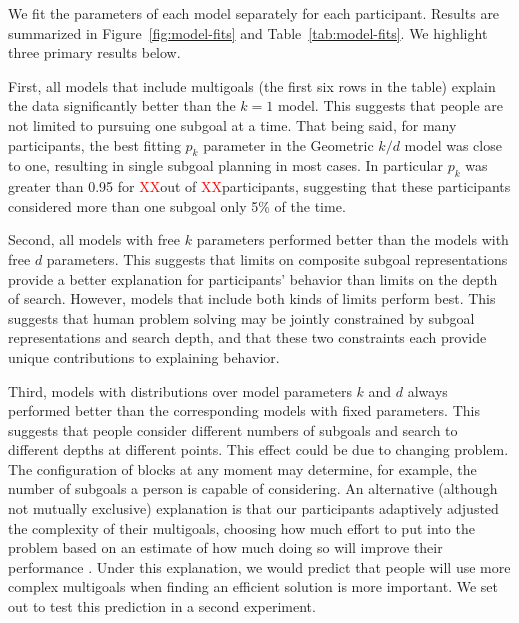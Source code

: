 \documentclass[10pt,letterpaper]{article}
\newcommand{\red}[1]{\textcolor{red}{#1}}
\newcommand{\MISSING}{\red{XX}}
\begin{document}
We fit the parameters of each model separately for each participant. Results are summarized in Figure~\ref{fig:model-fits} and Table~\ref{tab:model-fits}. We highlight three primary results below.

First, all models that include multigoals (the first six rows in the table) explain the data significantly better than the $k=1$ model. This suggests that people are not limited to pursuing one subgoal at a time. That being said, for many participants, the best fitting $p_k$ parameter in the Geometric $k/d$ model was close to one, resulting in single subgoal planning in most cases. In particular $p_k$ was greater than 0.95 for \MISSING out of \MISSING participants, suggesting that these participants considered more than one subgoal only 5\% of the time.


Second, all models with free $k$ parameters performed better than the models with free $d$ parameters. This suggests that limits on composite subgoal representations provide a better explanation for participants' behavior than limits on the depth of search. However, models that include both kinds of limits perform best. This suggests that human problem solving may be jointly constrained by subgoal representations and search depth, and that these two constraints each provide unique contributions to explaining behavior.

Third, models with distributions over model parameters $k$ and $d$ always performed better than the corresponding models with fixed parameters. This suggests that people consider different numbers of subgoals and search to different depths at different points. This effect could be due to changing problem. The configuration of blocks at any moment may determine, for example, the number of subgoals a person is capable of considering. An alternative (although not mutually exclusive) explanation is that our participants adaptively adjusted the complexity of their multigoals, choosing how much effort to put into the problem based on an estimate of how much doing so will improve their performance \citep{Shenhav2017,lieder2017strategy}.
Under this explanation, we would predict that people will use more complex multigoals when finding an efficient solution is more important. We set out to test this prediction in a second experiment.
\end{document}
